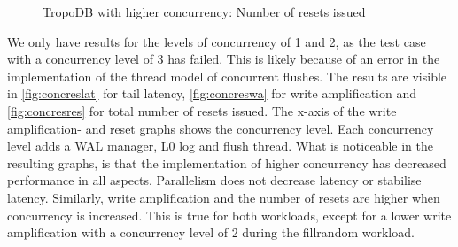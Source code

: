 \begin{figure}[!ht]
    \hspace*{-0.075\textwidth} %
    \raggedleft
    \caption{ TropoDB with higher concurrency: Number of resets issued }
    \label{fig:concresres}
\end{figure}


We only have results for the levels of concurrency of 1 and 2, as the test case with a concurrency level of 3 has failed. This is likely because of an error in the implementation of the thread model of concurrent flushes. The results are visible in \autoref{fig:concreslat} for tail latency, \autoref{fig:concreswa} for write amplification and \autoref{fig:concresres} for total number of resets issued. The x-axis of the write amplification- and reset graphs shows the concurrency level. Each concurrency level adds a WAL manager, L0 log and flush thread. What is noticeable in the resulting graphs, is that the implementation of higher concurrency has decreased performance in all aspects. Parallelism does not decrease latency or stabilise latency. Similarly, write amplification and the number of resets are higher when concurrency is increased. This is true for both workloads, except for a lower write amplification with a concurrency level of 2 during the fillrandom workload.

